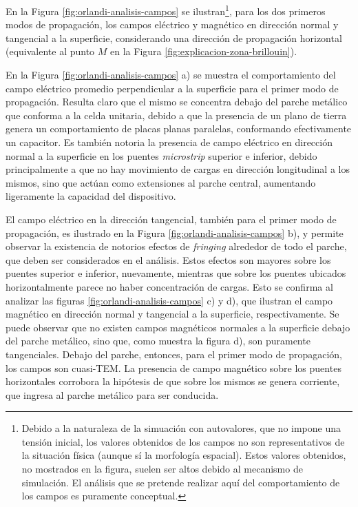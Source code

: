 En la Figura \ref{fig:orlandi-analisis-campos} se ilustran\footnote{Debido a la naturaleza de la simuación con autovalores, que no impone una tensión inicial, los valores obtenidos de los campos no son representativos de la situación física (aunque sí la morfología espacial). Estos valores obtenidos, no mostrados en la figura, suelen ser altos debido al mecanismo de simulación. El análisis que se pretende realizar aquí del comportamiento de los campos es puramente conceptual.}, para los dos primeros modos de propagación, los campos eléctrico y magnético en dirección normal y tangencial a la superficie, considerando una dirección de propagación horizontal (equivalente al punto $M$ en la Figura \ref{fig:explicacion-zona-brillouin}).

En la Figura \ref{fig:orlandi-analisis-campos} a) se muestra el comportamiento del campo eléctrico promedio perpendicular a la superficie para el primer modo de propagación. Resulta claro que el mismo se concentra debajo del parche metálico que conforma a la celda unitaria, debido a que la presencia de un plano de tierra genera un comportamiento de placas planas paralelas, conformando efectivamente un capacitor. Es también notoria la presencia de campo eléctrico en dirección normal a la superficie en los puentes \textit{microstrip} superior e inferior, debido principalmente a que no hay movimiento de cargas en dirección longitudinal a los mismos, sino que actúan como extensiones al parche central, aumentando ligeramente la capacidad del dispositivo.

El campo eléctrico en la dirección tangencial, también para el primer modo de propagación, es ilustrado en la Figura \ref{fig:orlandi-analisis-campos} b), y permite observar la existencia de notorios efectos de \textit{fringing} alrededor de todo el parche, que deben ser considerados en el análisis. Estos efectos son mayores sobre los puentes superior e inferior, nuevamente, mientras que sobre los puentes ubicados horizontalmente parece no haber concentración de cargas. Esto se confirma al analizar las figuras \ref{fig:orlandi-analisis-campos} c) y d), que ilustran el campo magnético en dirección normal y tangencial a la superficie, respectivamente. Se puede observar que no existen campos magnéticos normales a la superficie debajo del parche metálico, sino que, como muestra la figura d), son puramente tangenciales. Debajo del parche, entonces, para el primer modo de propagación, los campos son cuasi-TEM. La presencia de campo magnético sobre los puentes horizontales corrobora la hipótesis de que sobre los mismos se genera corriente, que ingresa al parche metálico para ser conducida.

